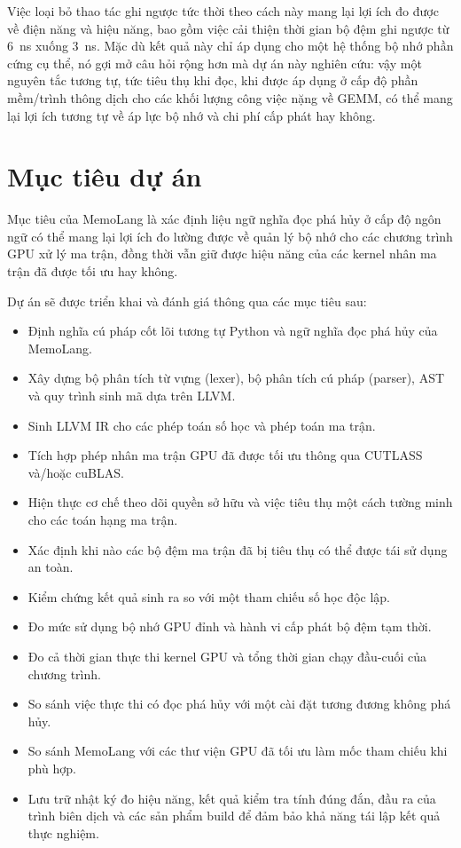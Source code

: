 \documentclass[a4paper]{article}
\begin{document}
    Việc loại bỏ thao tác ghi ngược tức thời theo cách này mang lại lợi ích đo được về điện năng và hiệu năng, bao gồm việc cải thiện thời gian bộ đệm ghi ngược từ 6~ns xuống 3~ns. Mặc dù kết quả này chỉ áp dụng cho một hệ thống bộ nhớ phần cứng cụ thể, nó gợi mở câu hỏi rộng hơn mà dự án này nghiên cứu: vậy một nguyên tắc tương tự, tức tiêu thụ khi đọc, khi được áp dụng ở cấp độ phần mềm/trình thông dịch cho các khối lượng công việc nặng về GEMM, có thể mang lại lợi ích tương tự về áp lực bộ nhớ và chi phí cấp phát hay không.
	
	\section{Mục tiêu dự án}
	
	Mục tiêu của MemoLang là xác định liệu ngữ nghĩa đọc phá hủy ở cấp độ ngôn ngữ có thể mang lại lợi ích đo lường được về quản lý bộ nhớ cho các chương trình GPU xử lý ma trận, đồng thời vẫn giữ được hiệu năng của các kernel nhân ma trận đã được tối ưu hay không.
	
	Dự án sẽ được triển khai và đánh giá thông qua các mục tiêu sau:
	
	\begin{itemize}
		\item Định nghĩa cú pháp cốt lõi tương tự Python và ngữ nghĩa đọc phá hủy của MemoLang.
		\item Xây dựng bộ phân tích từ vựng (lexer), bộ phân tích cú pháp (parser), AST và quy trình sinh mã dựa trên LLVM.
		\item Sinh LLVM IR cho các phép toán số học và phép toán ma trận.
		\item Tích hợp phép nhân ma trận GPU đã được tối ưu thông qua CUTLASS và/hoặc cuBLAS.
		\item Hiện thực cơ chế theo dõi quyền sở hữu và việc tiêu thụ một cách tường minh cho các toán hạng ma trận.
		\item Xác định khi nào các bộ đệm ma trận đã bị tiêu thụ có thể được tái sử dụng an toàn.
		\item Kiểm chứng kết quả sinh ra so với một tham chiếu số học độc lập.
		\item Đo mức sử dụng bộ nhớ GPU đỉnh và hành vi cấp phát bộ đệm tạm thời.
		\item Đo cả thời gian thực thi kernel GPU và tổng thời gian chạy đầu-cuối của chương trình.
		\item So sánh việc thực thi có đọc phá hủy với một cài đặt tương đương không phá hủy.
		\item So sánh MemoLang với các thư viện GPU đã tối ưu làm mốc tham chiếu khi phù hợp.
		\item Lưu trữ nhật ký đo hiệu năng, kết quả kiểm tra tính đúng đắn, đầu ra của trình biên dịch và các sản phẩm build để đảm bảo khả năng tái lập kết quả thực nghiệm.
	\end{itemize}
	
\end{document}
